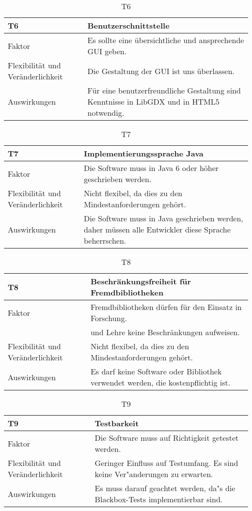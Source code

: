 \begin{table}[H]
\caption{T6}
\begin{tabular}{|p{3cm}|p{12cm}|}\hline
\textbf{T6} & \textbf{Benutzerschnittstelle} \\ \hline \hline
Faktor & Es sollte eine übersichtliche und ansprechende GUI geben.\\ \hline
Flexibilität und Veränderlichkeit & Die Gestaltung der GUI ist uns überlassen. \\ \hline
Auswirkungen & Für eine benutzerfreundliche Gestaltung sind Kenntnisse in LibGDX und in HTML5 notwendig.\\ \hline
\end{tabular}
\end{table}

\begin{table}[H]
\caption{T7}
\begin{tabular}{|p{3cm}|p{12cm}|}\hline
\textbf{T7} & \textbf{Implementierungssprache Java} \\ \hline \hline
Faktor & Die Software muss in Java 6 oder höher geschrieben werden.\\ \hline
Flexibilität und Veränderlichkeit & Nicht flexibel, da dies zu den Mindestanforderungen gehört.\\ \hline
Auswirkungen & Die Software muss in Java geschrieben werden, daher müssen alle Entwickler diese Sprache beherrschen. \\ \hline
\end{tabular}
\end{table}

\begin{table}[H]
\caption{T8}
\begin{tabular}{|p{3cm}|p{12cm}|}\hline
\textbf{T8} & \textbf{Beschränkungsfreiheit für Fremdbibliotheken}\\ \hline \hline
Faktor & Fremdbibliotheken dürfen für den Einsatz in Forschung.\\
& und Lehre keine Beschränkungen aufweisen. \\ \hline
Flexibilität und Veränderlichkeit & Nicht flexibel, da dies zu den Mindestanforderungen gehört.\\ \hline
Auswirkungen & Es darf keine Software oder Bibliothek verwendet werden, die kostenpflichtig ist. \\ \hline
\end{tabular}
\end{table}


\begin{table}[H]
\caption{T9}
\begin{tabular}{|p{3cm}|p{12cm}|}\hline
\textbf{T9} & \textbf{Testbarkeit}\\ \hline \hline
Faktor & Die Software muss auf Richtigkeit getestet werden. \\ \hline
Flexibilität und Veränderlichkeit & Geringer Einfluss auf Testumfang. Es sind keine Ver"anderungen zu erwarten. \\ \hline
Auswirkungen & Es muss darauf geachtet werden, da"s die Blackbox-Tests implementierbar sind. \\ \hline
\end{tabular}
\end{table}

